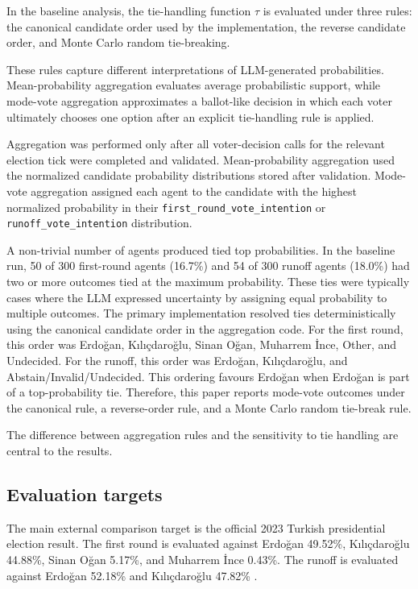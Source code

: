 \documentclass[pdflatex,sn-mathphys-num,iicol]{sn-jnl}
\begin{document}
In the baseline analysis, the tie-handling function $\tau$ is evaluated under
three rules: the canonical candidate order used by the implementation, the
reverse candidate order, and Monte Carlo random tie-breaking.

These rules capture different interpretations of LLM-generated probabilities.
Mean-probability aggregation evaluates average probabilistic support, while
mode-vote aggregation approximates a ballot-like decision in which each voter
ultimately chooses one option after an explicit tie-handling rule is applied.

Aggregation was performed only after all voter-decision calls for the relevant
election tick were completed and validated. Mean-probability aggregation used the
normalized candidate probability distributions stored after validation. Mode-vote
aggregation assigned each agent to the candidate with the highest normalized
probability in their \texttt{first\_round\_vote\_intention} or
\texttt{runoff\_vote\_intention} distribution.

A non-trivial number of agents produced tied top probabilities. In the baseline
run, 50 of 300 first-round agents (16.7\%) and 54 of 300 runoff agents (18.0\%)
had two or more outcomes tied at the maximum probability. These ties were
typically cases where the LLM expressed uncertainty by assigning equal
probability to multiple outcomes. The primary implementation resolved ties
deterministically using the canonical candidate order in the aggregation code.
For the first round, this order was Erdoğan, Kılıçdaroğlu, Sinan Oğan,
Muharrem İnce, Other, and Undecided. For the runoff, this order was Erdoğan,
Kılıçdaroğlu, and Abstain/Invalid/Undecided. This ordering favours Erdoğan when
Erdoğan is part of a top-probability tie. Therefore, this paper reports mode-vote
outcomes under the canonical rule, a reverse-order rule, and a Monte Carlo
random tie-break rule.

The difference between aggregation rules and the sensitivity to tie handling are
central to the results.

\subsection{Evaluation targets}\label{subsec:evaluation}

The main external comparison target is the official 2023 Turkish presidential
election result. The first round is evaluated against Erdoğan 49.52\%,
Kılıçdaroğlu 44.88\%, Sinan Oğan 5.17\%, and Muharrem İnce 0.43\%. The runoff
is evaluated against Erdoğan 52.18\% and Kılıçdaroğlu 47.82\% \cite{ysk2023}.
\end{document}
